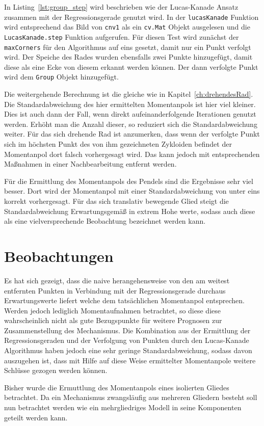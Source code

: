 In Listing~\ref{lst:group_step} wird beschrieben wie der Lucas-Kanade Ansatz zusammen mit der Regressionsgerade genutzt wird.
In der \lstinline{lucasKanade} Funktion wird entsprechend das Bild von \lstinline{cnv1} als ein \lstinline{cv.Mat} Objekt ausgelesen und die \lstinline{LucasKanade.step} Funktion aufgerufen.
Für diesen Test wird zunächst der \lstinline{maxCorners} für den  Algorithmus auf eins gesetzt, damit nur ein Punkt verfolgt wird.
Der Speiche des Rades wurden ebensfalls zwei Punkte hinzugefügt, damit diese als eine Ecke von diesem erkannt werden können.
Der dann verfolgte Punkt wird dem \lstinline{Group} Objekt hinzugefügt.

Die weitergehende Berechnung ist die gleiche wie in Kapitel~\ref{ch:drehendesRad}.
Die Standardabweichung des hier ermittelten Momentanpols ist hier viel kleiner.
Dies ist auch dann der Fall, wenn direkt aufeinanderfolgende Iterationen genutzt werden.
Erhöht man die Anzahl dieser, so reduziert sich die Standardabweichung weiter.
Für das sich drehende Rad ist anzumerken, dass wenn der verfolgte Punkt sich im höchsten Punkt des von ihm gezeichneten Zykloiden befindet der Momentanpol dort falsch vorhergesagt wird.
Das kann jedoch mit entsprechenden Maßnahmen in einer Nachbearbeitung entfernt werden.

Für die Ermittlung des Momentanpols des Pendels sind die Ergebnisse sehr viel besser.
Dort wird der Momentanpol mit einer Standardabweichung von unter eins korrekt vorhergesagt.
Für das sich translativ bewegende Glied steigt die Standardabweichung Erwartungsgemäß in extrem Hohe werte, sodass auch diese als eine vielversprechende Beobachtung bezeichnet werden kann.


\section{Beobachtungen}
Es hat sich gezeigt, dass die naive herangehensweise von den am weitest entfernten Punkten in Verbindung mit der Regressionsgerade durchaus Erwartungswerte liefert welche dem tatsächlichen Momentanpol entsprechen.
Werden jedoch lediglich Momentaufnahmen betrachtet, so diese diese wahrscheinlich nicht als gute Bezugspunkte für weitere Prognosen zur Zusammenstellung des Mechanismus.
Die Kombination aus der Ermittlung der Regressionsgeraden und der Verfolgung von Punkten durch den Lucas-Kanade Algorithmus haben jedoch eine sehr geringe Standardabweichung, sodass davon auszugehen ist, dass mit Hilfe auf diese Weise ermittelter Momentanpole weitere Schlüsse gezogen werden können.

Bisher wurde die Ermuttlung des Momentanpols eines isolierten Gliedes betrachtet.
Da ein Mechanismus zwangsläufig aus mehreren Gliedern besteht soll nun betrachtet werden wie ein mehrgliedriges Modell in seine Komponenten geteilt werden kann.
